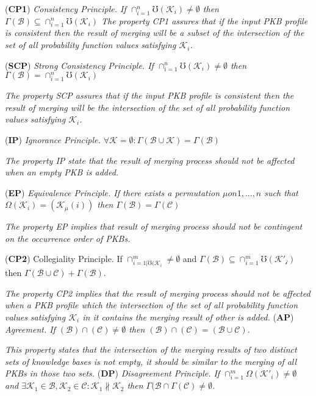 \documentclass[]{iosart2c}
\begin{document}
  (\textbf{CP1}) \textit{Consistency Principle. If $\cap^n_{i=1}\mho(\mathcal{K}_i) \neq \emptyset$ then $\Gamma(\mathcal{B}) \subseteq \cap^n_{i=1}\mho(\mathcal{K}_i)$
    The property CP1 assures that if the input PKB profile is consistent then the result of merging will be a subset of the intersection of the set of all probability function values satisfying $\mathcal{K}_i$.}

  (\textbf{SCP}) \textit{Strong Consistency Principle. If $\cap^n_{i=1}\mho(\mathcal{K}_i) \neq \emptyset$ then $\Gamma(\mathcal{B}) = \cap^n_{i=1}\mho(\mathcal{K}_i)$}

  \textit{The property SCP assures that if the input PKB profile is consistent then the result of merging will be the intersection of the set of all probability function
  values satisfying $\mathcal{K}_i$.}

  (\textbf{IP}) \textit{Ignorance Principle. $\forall \mathcal{K} = \emptyset : \Gamma(\mathcal{B} \cup \mathcal{K}) = \Gamma(\mathcal{B})$}

  \textit{The property IP state that the result of merging process should not be affected when an empty PKB is added.}

  (\textbf{EP}) \textit{Equivalence Principle. If there exists a permutation $\mu on {1, ... , n}$ such that $\Omega(\mathcal{K}_i) = (\mathcal{K}_\mu(i))$ then $\Gamma(\mathcal{B}) =  \Gamma(\mathcal{C})$}

  \textit{The property EP implies that result of merging process should not be contingent on the occurrence order of PKBs.}

  (\textbf{CP2}) Collegiality Principle. If $\cap^m_{i=1|\mho(\mathcal{K}_i} \neq \emptyset$ and $\Gamma(\mathcal{B}) \subseteq \cap^m_{i=1}\mho(\mathcal{K'_i})$ then $\Gamma(\mathcal{B} \cup \mathcal{C}) + \Gamma(\mathcal{B})$.

  \textit{The property CP2 implies that the result of merging process should not be affected when a PKB profile which the intersection of the set of all probability function values satisfying $\mathcal{K}_i$ in it contains the merging result of other is added.
  }
  (\textbf{AP}) \textit{Agreement. If $(\mathcal{B}) \cap (\mathcal{C}) \neq \emptyset$ then $(\mathcal{B}) \cap (\mathcal{C}) = (\mathcal{B} \cup \mathcal{C})$.}

  \textit{This property states that the intersection of the merging results of two distinct sets of knowledge bases is not empty, it should be similar to the merging of all PKBs in those two sets.
  }
  (\textbf{DP}) \textit{Disagreement Principle. If $\cap^m_{i=1}\Omega(\mathcal{K}'_i) \neq \emptyset$ and $\exists \mathcal{K}_1 \in \mathcal{B}, \mathcal{K}_2 \in \mathcal{C}: \mathcal{K}_1 \nparallel \mathcal{K}_2$ then $\Gamma(\mathcal{B} \cap \Gamma(\mathcal{C}) \neq \emptyset$.}
\end{document}
